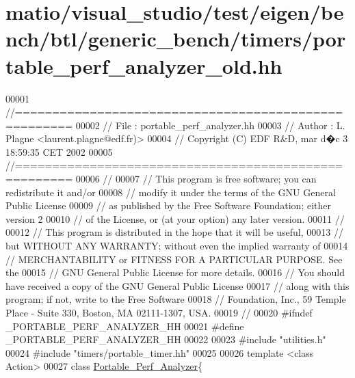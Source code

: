 \hypertarget{matio_2visual__studio_2test_2eigen_2bench_2btl_2generic__bench_2timers_2portable__perf__analyzer__old_8hh_source}{}\section{matio/visual\+\_\+studio/test/eigen/bench/btl/generic\+\_\+bench/timers/portable\+\_\+perf\+\_\+analyzer\+\_\+old.hh}
\label{matio_2visual__studio_2test_2eigen_2bench_2btl_2generic__bench_2timers_2portable__perf__analyzer__old_8hh_source}

\begin{DoxyCode}
00001 \textcolor{comment}{//=====================================================}
00002 \textcolor{comment}{// File   :  portable\_perf\_analyzer.hh}
00003 \textcolor{comment}{// Author :  L. Plagne <laurent.plagne@edf.fr)>}
00004 \textcolor{comment}{// Copyright (C) EDF R&D,  mar d�c 3 18:59:35 CET 2002}
00005 \textcolor{comment}{//=====================================================}
00006 \textcolor{comment}{//}
00007 \textcolor{comment}{// This program is free software; you can redistribute it and/or}
00008 \textcolor{comment}{// modify it under the terms of the GNU General Public License}
00009 \textcolor{comment}{// as published by the Free Software Foundation; either version 2}
00010 \textcolor{comment}{// of the License, or (at your option) any later version.}
00011 \textcolor{comment}{//}
00012 \textcolor{comment}{// This program is distributed in the hope that it will be useful,}
00013 \textcolor{comment}{// but WITHOUT ANY WARRANTY; without even the implied warranty of}
00014 \textcolor{comment}{// MERCHANTABILITY or FITNESS FOR A PARTICULAR PURPOSE.  See the}
00015 \textcolor{comment}{// GNU General Public License for more details.}
00016 \textcolor{comment}{// You should have received a copy of the GNU General Public License}
00017 \textcolor{comment}{// along with this program; if not, write to the Free Software}
00018 \textcolor{comment}{// Foundation, Inc., 59 Temple Place - Suite 330, Boston, MA  02111-1307, USA.}
00019 \textcolor{comment}{//}
00020 \textcolor{preprocessor}{#ifndef \_PORTABLE\_PERF\_ANALYZER\_HH}
00021 \textcolor{preprocessor}{#define \_PORTABLE\_PERF\_ANALYZER\_HH}
00022 
00023 \textcolor{preprocessor}{#include "utilities.h"}
00024 \textcolor{preprocessor}{#include "timers/portable\_timer.hh"}
00025 
00026 \textcolor{keyword}{template} <\textcolor{keyword}{class} Action>
00027 \textcolor{keyword}{class }\hyperlink{class_portable___perf___analyzer}{Portable\_Perf\_Analyzer}\{

\end{DoxyCode}
